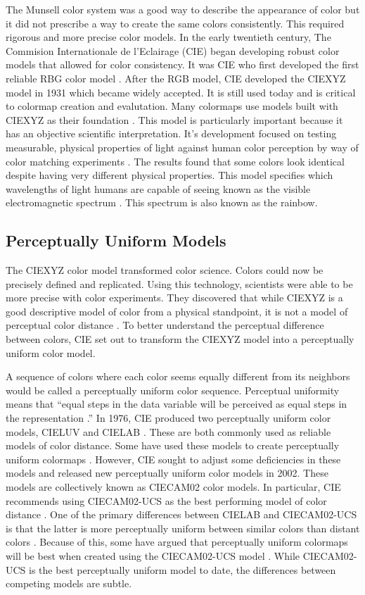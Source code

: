 \documentclass[journal,12pt]{IEEEtran}
\begin{document}
The Munsell color system was a good way to describe the appearance of color but it did
not prescribe a way to create the same colors consistently.
This required rigorous and more precise color models. In the early twentieth century,
The Commision Internationale de l'Eclairage (CIE) began developing robust color models
that allowed for color consistency. It was CIE who first developed the first reliable
RBG color model \cite{colorimetry}.
After the RGB model, CIE developed the CIEXYZ model in 1931
which became widely accepted. It is still used today and is critical to colormap creation
and evalutation. Many colormaps use models built with CIEXYZ as their foundation \cite{viridis}.
This model is particularly important because it has an objective scientific interpretation.
It's development focused on testing measurable, physical properties of light
against human color perception by way of color matching experiments 
\cite{colorimetry}. The results found that some colors look identical despite having very different physical
properties. This model specifies which wavelengths of light humans 
are capable of seeing known as the visible electromagnetic
spectrum \cite{colormapping}. This spectrum is also known as the rainbow.

\subsection{Perceptually Uniform Models}

The CIEXYZ color model transformed color science. Colors could now be precisely defined and replicated.
Using this technology, scientists were able to be more precise with color experiments.
They discovered that while CIEXYZ is a good descriptive model of color from a physical standpoint, it
is not a model of perceptual color distance \cite{viridis}.
To better understand the
perceptual difference between colors, CIE set out to
transform the CIEXYZ model into a perceptually uniform color model.

A sequence of colors where each color seems equally different from its neighbors
would be called a perceptually uniform color sequence. Perceptual uniformity means that
``equal steps in the data variable will be perceived as equal steps in the representation \cite{endofrainbow}.''
In 1976, CIE produced two perceptually uniform color models, CIELUV and CIELAB \cite{colorimetry}.
These are both commonly used as reliable models of color distance. Some have used these models
to create perceptually uniform colormaps \cite{viridis,matlab}.
However, CIE sought to adjust some deficiencies in these models and
released new perceptually uniform color models in 2002. These models are collectively known as 
CIECAM02 color models. In particular, CIE recommends using CIECAM02-UCS as the best
performing model of color distance \cite{ciecam02}.
One of the primary differences between CIELAB and CIECAM02-UCS is that the latter
is more perceptually uniform between similar colors than distant colors \cite{ciecam02}.
Because of this, some have argued that
perceptually uniform colormaps will be best when created using the CIECAM02-UCS model \cite{viridis}.
While CIECAM02-UCS is the best perceptually uniform model to date, the differences between competing models are subtle.
\end{document}

